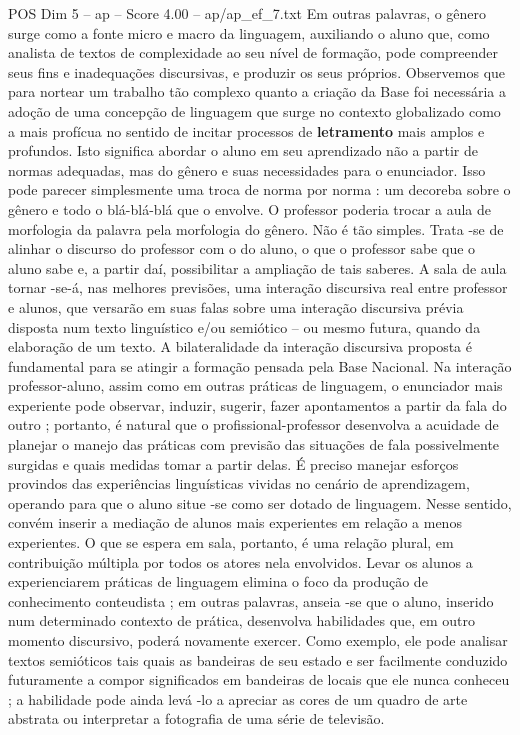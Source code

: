 \begin{textsample}{POS Dim 5 – ap – Score 4.00 – ap/ap\_ef\_7.txt}
Em outras palavras, o gênero surge como a fonte micro e macro da linguagem, auxiliando o aluno que, como analista de textos de complexidade ao seu nível de formação, pode compreender seus fins e inadequações discursivas, e produzir os seus próprios.
Observemos que para nortear um trabalho tão complexo quanto a criação da Base foi necessária a adoção de uma concepção de linguagem que surge no contexto globalizado como a mais profícua no sentido de incitar processos de \textbf{letramento} mais amplos e profundos.
Isto significa abordar o aluno em seu aprendizado não a partir de normas adequadas, mas do gênero e suas necessidades para o enunciador.
Isso pode parecer simplesmente uma troca de norma por norma : um decoreba sobre o gênero e todo o blá-blá-blá que o envolve.
O professor poderia trocar a aula de morfologia da palavra pela morfologia do gênero.
Não é tão simples.
Trata -se de alinhar o discurso do professor com o do aluno, o que o professor sabe que o aluno sabe e, a partir daí, possibilitar a ampliação de tais saberes.
A sala de aula tornar -se-á, nas melhores previsões, uma interação discursiva real entre professor e alunos, que versarão em suas falas sobre uma interação discursiva prévia disposta num texto linguístico e/ou semiótico – ou mesmo futura, quando da elaboração de um texto.
A bilateralidade da interação discursiva proposta é fundamental para se atingir a formação pensada pela Base Nacional.
Na interação professor-aluno, assim como em outras práticas de linguagem, o enunciador mais experiente pode observar, induzir, sugerir, fazer apontamentos a partir da fala do outro ; portanto, é natural que o profissional-professor desenvolva a acuidade de planejar o manejo das práticas com previsão das situações de fala possivelmente surgidas e quais medidas tomar a partir delas.
É preciso manejar esforços provindos das experiências linguísticas vividas no cenário de aprendizagem, operando para que o aluno situe -se como ser dotado de linguagem.
Nesse sentido, convém inserir a mediação de alunos mais experientes em relação a menos experientes.
O que se espera em sala, portanto, é uma relação plural, em contribuição múltipla por todos os atores nela envolvidos.
Levar os alunos a experienciarem práticas de linguagem elimina o foco da produção de conhecimento conteudista ; em outras palavras, anseia -se que o aluno, inserido num determinado contexto de prática, desenvolva habilidades que, em outro momento discursivo, poderá novamente exercer.
Como exemplo, ele pode analisar textos semióticos tais quais as bandeiras de seu estado e ser facilmente conduzido futuramente a compor significados em bandeiras de locais que ele nunca conheceu ; a habilidade pode ainda levá -lo a apreciar as cores de um quadro de arte abstrata ou interpretar a fotografia de uma série de televisão.

\end{textsample}
